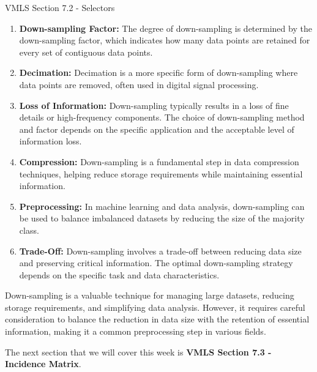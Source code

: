 \begin{notes}{VMLS Section 7.2 - Selectors}
\begin{enumerate}
        \item \textbf{Down-sampling Factor:} The degree of down-sampling is determined by the down-sampling factor, which indicates how many data points are retained for every set of 
        contiguous data points.
        
        \item \textbf{Decimation:} Decimation is a more specific form of down-sampling where data points are removed, often used in digital signal processing.
        
        \item \textbf{Loss of Information:} Down-sampling typically results in a loss of fine details or high-frequency components. The choice of down-sampling method and factor depends on 
        the specific application and the acceptable level of information loss.
        
        \item \textbf{Compression:} Down-sampling is a fundamental step in data compression techniques, helping reduce storage requirements while maintaining essential information.
        
        \item \textbf{Preprocessing:} In machine learning and data analysis, down-sampling can be used to balance imbalanced datasets by reducing the size of the majority class.
        
        \item \textbf{Trade-Off:} Down-sampling involves a trade-off between reducing data size and preserving critical information. The optimal down-sampling strategy depends on the specific 
        task and data characteristics.
    \end{enumerate}

    Down-sampling is a valuable technique for managing large datasets, reducing storage requirements, and simplifying data analysis. However, it requires careful consideration to balance the 
    reduction in data size with the retention of essential information, making it a common preprocessing step in various fields.
\end{notes}

The next section that we will cover this week is \textbf{VMLS Section 7.3 - Incidence Matrix}.

